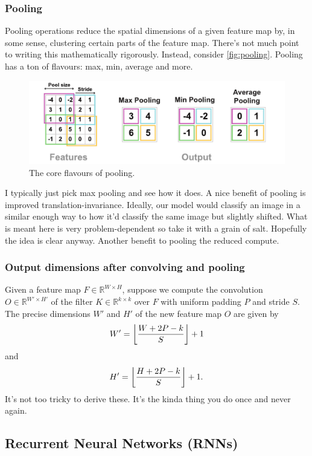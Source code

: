 \documentclass[11pt]{article}
\begin{document}
\subsubsection{Pooling}
Pooling operations reduce the spatial dimensions of a given feature map by, in some sense, clustering certain parts of the feature map. There's not much point to writing this mathematically rigorously. Instead, consider \autoref{fig:pooling}. Pooling has a ton of flavours: max, min, average and more.

\begin{figure}[ht]
    \centering
    \includegraphics[width=1\textwidth]{./figures/neural_nets/CNN_pooling.pdf}
    \caption{The core flavours of pooling. }
    \label{fig:pooling}
\end{figure}

\noindent I typically just pick max pooling and see how it does. A nice benefit of pooling is improved translation-invariance. Ideally, our model would classify an image in a similar enough way to how it'd classify the same image but slightly shifted. What is meant here is very problem-dependent so take it with a grain of salt. Hopefully the idea is clear anyway. Another benefit to pooling the reduced compute.

\subsubsection{Output dimensions after convolving and pooling}
Given a feature map $F\in\mathbb{R}^{W\times H}$, suppose we compute the convolution $O\in\mathbb{R}^{W'\times H'}$ of the filter $K\in\mathbb{R}^{k\times k}$ over $F$ with uniform padding $P$ and stride $S$. The precise dimensions $W'$ and $H'$ of the new feature map $O$ are given by
$$
W'
=
\left\lfloor
\frac{W+2P-k}{S}
\right\rfloor
+1
$$
and
$$
H'
=
\left\lfloor
\frac{H+2P-k}{S}
\right\rfloor
+1.
$$
It's not too tricky to derive these. It's the kinda thing you do once and never again. 

\subsection{Recurrent Neural Networks (RNNs)}
\TODO{} 
\end{document}
